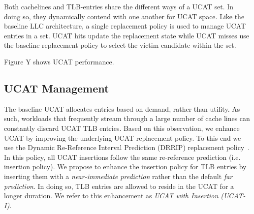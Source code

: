 Both cachelines and TLB-entries share the different ways of a UCAT
set. In doing so, they dynamically contend with one another for UCAT
space. Like the baseline LLC architecture, a single replacement policy
is used to manage UCAT entries in a set. UCAT hits update the
replacement state while UCAT misses use the baseline replacement
policy to select the victim candidate within the set. 

Figure Y shows UCAT performance.


% 
% 

\subsection{UCAT Management}


\noindent The baseline UCAT allocates entries based on demand, rather
than utility. As such, workloads that frequently stream through a
large number of cache lines can constantly discard UCAT TLB entries.
Based on this observation, we enhance UCAT by improving the underlying
UCAT replacement policy. To this end we use the Dynamic Re-Reference
Interval Prediction (DRRIP) replacement policy~\cite{}. In this
policy, all UCAT insertions follow the same re-reference prediction
(i.e. insertion policy). We propose to enhance the insertion policy
for TLB entries by inserting them with a {\em near-immediate
prediction} rather than the default {\em far prediction}. In doing so,
TLB entries are allowed to reside in the UCAT for a longer duration.
We refer to this enhancement as {\em UCAT with Insertion (UCAT-I)}.


